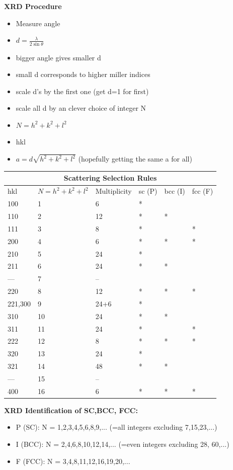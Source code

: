 \textbf{XRD Procedure}
\begin{itemize}
    \item Measure angle 
    \item $d = \frac{\lambda}{2\sin\theta}$
    \item bigger angle gives smaller d
    \item small d corresponds to higher miller indices
    \item scale d's by the first one (get d=1 for first)
    \item scale all d by an clever choice of integer N
    \item $N = h^2 + k^2 + l^2 $
    \item {hkl}
    \item $a = d \sqrt{h^2 + k^2 + l^2}$ (hopefully getting the same a for all)
    \end{itemize}

\begin{tabular}{ |p{2cm}|p{3cm}|p{2cm}|p{1.5cm}|p{1.5cm}|p{1.5cm}|  }
 \hline
 \multicolumn{6}{|c|}{\textbf{Scattering Selection Rules}} \\
 \hline
{hkl} & $N=h^2+k^2+l^2$ & Multiplicity & sc (P) & bcc (I) & fcc (F)\\
 \hline
 100 & 1 & 6        & * &   &  \\
 110 & 2 & 12       & * & * &  \\
 111 & 3 & 8        & * &   & *\\
 200 & 4 & 6        & * & * & *\\
 210 & 5 & 24       & * &   &  \\
 211 & 6 & 24       & * & * &  \\
 --- & 7 & --       &   &   &  \\
 220 & 8 & 12       & * & * & *\\
 221,300 & 9 & 24+6 & * &   &  \\
 310 & 10 & 24      & * & * &  \\
 311 & 11 & 24      & * &   & *\\
 222 & 12 & 8       & * & * & *\\
 320 & 13 & 24      & * &   &  \\
 321 & 14 & 48      & * & * &  \\
 --- & 15 & --      &   &   &  \\
 400 & 16 & 6       & * & * & *\\
 \hline
\end{tabular}

\textbf{XRD Identification of SC,BCC, FCC:}
\begin{itemize}
    \item P (SC): N = 1,2,3,4,5,6,8,9,... (=all integers excluding 7,15,23,...)
    \item I (BCC): N = 2,4,6,8,10,12,14,... (=even integers excluding 28, 60,...)
    \item F (FCC): N = 3,4,8,11,12,16,19,20,...
\end{itemize}



